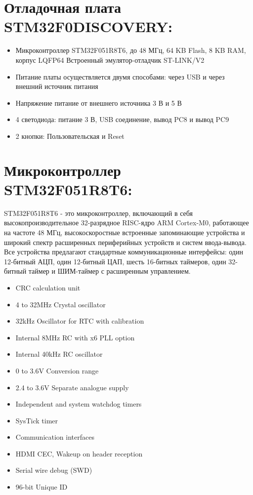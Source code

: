 \documentclass{article}
\begin{document}
\section{Отладочная плата STM32F0DISCOVERY:}
	\begin{itemize}
		\item Микроконтроллер STM32F051R8T6, до 48 МГц, 64 KB Flash, 8 KB RAM, корпус LQFP64
Встроенный эмулятор-отладчик ST-LINK/V2
		\item Питание платы осуществляется двумя способами: через USB и через внешний источник
питания
		\item Напряжение питание от внешнего источника 3 В и 5 В
		\item 4 светодиода: питание 3 В, USB соединение, вывод PC8 и вывод PC9
		\item 2 кнопки: Пользовательская и Reset
	\end{itemize}
	\begin{figure}[h!]
	\end{figure}
\newpage
\section{Микроконтроллер STM32F051R8T6:}
STM32F051R8T6 - это микроконтроллер, включающий в себя высокопроизводительное 32-разрядное RISC-ядро ARM Cortex-M0, работающее на частоте 48 МГц, высокоскоростные встроенные запоминающие устройства и широкий спектр расширенных периферийных устройств и систем ввода-вывода. Все устройства предлагают стандартные коммуникационные интерфейсы: один 12-битный АЦП, один 12-битный ЦАП, шесть 16-битных таймеров, один 32-битный таймер и ШИМ-таймер с расширенным управлением.
	\begin{itemize}
		\item CRC calculation unit
		\item 4 to 32MHz Crystal oscillator
		\item 32kHz Oscillator for RTC with calibration
		\item Internal 8MHz RC with x6 PLL option
		\item Internal 40kHz RC oscillator
		\item 0 to 3.6V Conversion range
		\item 2.4 to 3.6V Separate analogue supply
		\item Independent and system watchdog timers
		\item SysTick timer
		\item Communication interfaces
		\item HDMI CEC, Wakeup on header reception
		\item Serial wire debug (SWD)
		\item 96-bit Unique ID
	\end{itemize}
	\begin{figure}[h!]
	\end{figure}
\newpage
\end{document}
